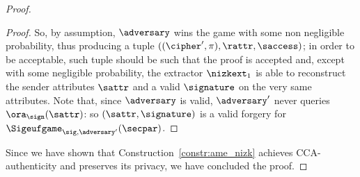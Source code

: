 \begin{proof}
\begin{lemma}
\begin{proof}
            So, by assumption, $\adversary$ wins the game with some non negligible probability, thus producing a tuple $((\cipher', \pi), \rattr, \saccess)$; in order to be acceptable, such tuple should be such that the proof is accepted and, except with some negligible probability, the extractor $\nizkext_1$ is able to reconstruct the sender attributes $\sattr$ and a valid $\signature$ on the very same attributes.
            Note that, since $\adversary$ is valid, $\adversary'$ never queries $\ora_\sign(\sattr)$: so $(\sattr, \signature)$ is a valid forgery for $\Sigeufgame_{\sig, \adversary'}(\secpar)$.
        \end{proof}
    \end{lemma}
    Since we have shown that Construction~\ref{constr:ame_nizk} achieves CCA-authenticity and preserves its privacy, we have concluded the proof.
\end{proof}
